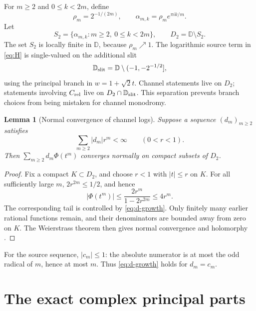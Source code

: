 \documentclass[11pt]{article}
\newtheorem{lemma}[theorem]{Lemma}
\newcommand{\D}{\mathbb D}
\newcommand{\Crel}{C_{\rm rel}}
\begin{document}
For \(m\ge2\) and \(0\le k<2m\), define
\begin{equation}\label{eq:poles}
 \rho_m=2^{-1/(2m)},\qquad
 \alpha_{m,k}=\rho_m e^{\pi i k/m}.
\end{equation}
Let
\begin{equation}\label{eq:S2}
 S_2=\{\alpha_{m,k}:m\ge2,\ 0\le k<2m\},\qquad
 D_2=\D\setminus S_2.
\end{equation}
The set \(S_2\) is locally finite in \(\D\), because \(\rho_m\nearrow1\).
The logarithmic source term in \cref{eq:H} is single-valued on the additional
slit
\begin{equation}\label{eq:slit}
 \D_{\rm slit}=\D\setminus(-1,-2^{-1/2}],
\end{equation}
using the principal branch in \(w=1+\sqrt2t\).  Channel statements live on
\(D_2\); statements involving \(\Crel\) live on
\(D_2\cap\D_{\rm slit}\).  This separation prevents branch choices from
being mistaken for channel monodromy.

\begin{lemma}[Normal convergence of channel logs]\label{lem:channel-normal}
Suppose a sequence \((d_m)_{m\ge2}\) satisfies
\begin{equation}\label{eq:d-growth}
 \sum_{m\ge2}|d_m|r^m<\infty\qquad(0<r<1).
\end{equation}
Then \(\sum_{m\ge2}d_m\Phi(t^m)\) converges normally on compact subsets of
\(D_2\).
\end{lemma}

\begin{proof}
Fix a compact \(K\subset D_2\), and choose \(r<1\) with \(|t|\le r\) on
\(K\).  For all sufficiently large \(m\),
\(2r^{2m}\le1/2\), and hence
\[
 |\Phi(t^m)|\le \frac{2r^m}{1-2r^{2m}}\le4r^m.
\]
The corresponding tail is controlled by \cref{eq:d-growth}.  Only finitely
many earlier rational functions remain, and their denominators are bounded
away from zero on \(K\).  The Weierstrass theorem then gives normal
convergence and holomorphy \cite{Conway1978,Remmert1991}.
\end{proof}

For the source sequence, \(|c_m|\le1\): the absolute numerator is at most
the odd radical of \(m\), hence at most \(m\).  Thus \cref{eq:d-growth}
holds for \(d_m=c_m\).

\section{The exact complex principal parts}
\end{document}
